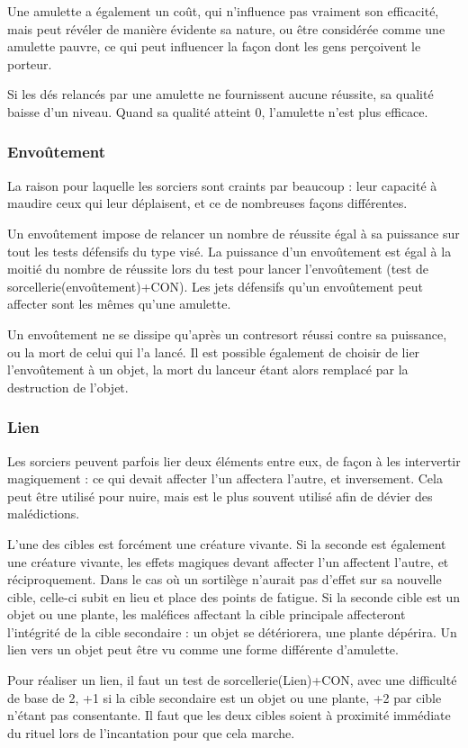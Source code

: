 \documentclass[10pt,a4paper,twocolumn]{book}
\begin{document}
Une amulette a également un coût, qui n'influence pas vraiment son efficacité, mais peut révéler de manière évidente sa nature, ou être considérée comme une amulette pauvre, ce qui peut influencer la façon dont les gens perçoivent le porteur.

Si les dés relancés par une amulette ne fournissent aucune réussite, sa qualité baisse d'un niveau. Quand sa qualité atteint 0, l'amulette n'est plus efficace. 
\subsubsection{Envoûtement}
La raison pour laquelle les sorciers sont craints par beaucoup : leur capacité à maudire ceux qui leur déplaisent, et ce de nombreuses façons différentes.

Un envoûtement impose de relancer un nombre de réussite égal à sa puissance sur tout les tests défensifs du type visé. La puissance d'un envoûtement est égal à la moitié du nombre de réussite lors du test pour lancer l'envoûtement (test de sorcellerie(envoûtement)+CON). Les jets défensifs qu'un envoûtement peut affecter sont les mêmes qu'une amulette.

Un envoûtement ne se dissipe qu'après un contresort réussi contre sa puissance, ou la mort de celui qui l'a lancé. Il est possible également de choisir de lier l'envoûtement à un objet, la mort du lanceur étant alors remplacé par la destruction de l'objet.
\subsubsection{Lien}
Les sorciers peuvent parfois lier deux éléments entre eux, de façon à les intervertir magiquement : ce qui devait affecter l'un affectera l'autre, et inversement. Cela peut être utilisé pour nuire, mais est le plus souvent utilisé afin de dévier des malédictions.

L'une des cibles est forcément une créature vivante.
Si la seconde est également une créature vivante, les effets magiques devant affecter l'un affectent l'autre, et réciproquement. Dans le cas où un sortilège n'aurait pas d'effet sur sa nouvelle cible, celle-ci subit en lieu et place des points de fatigue.
Si la seconde cible est un objet ou une plante, les maléfices affectant la cible principale affecteront l'intégrité de la cible secondaire : un objet se détériorera, une plante dépérira. Un lien vers un objet peut être vu comme une forme différente d'amulette. 

Pour réaliser un lien, il faut un test de sorcellerie(Lien)+CON, avec une difficulté de base de 2, +1 si la cible secondaire est un objet ou une plante, +2 par cible n'étant pas consentante. Il faut que les deux cibles soient à proximité immédiate du rituel lors de l'incantation pour que cela marche.
\end{document}
